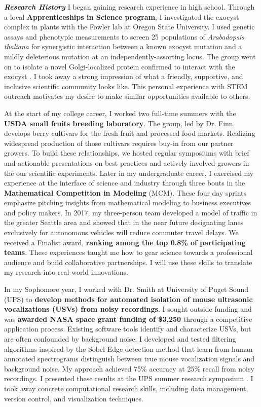 \noindent
\textit{\textbf{Research History}}
I began gaining research experience in high school.
Through a local \textbf{Apprenticeships in Science program}, I investigated the exocyst complex in plants with the Fowler lab at Oregon State University.
I used genetic assays and phenotypic measurements to screen 25 populations of \textit{Arabadopsis thaliana} for synergistic interaction between a known exocyst mutation and a mildly deleterious mutation at an independently-assorting locus.
The group went on to isolate a novel Golgi-localized protein confirmed to interact with the exocyst \cite{fowler}.
I took away a strong impression of what a friendly, supportive, and inclusive scientific community looks like.
This personal experience with STEM outreach motivates my desire to make similar opportunities available to others.

At the start of my college career, I worked two full-time summers with the \textbf{USDA small fruits breeding laboratory}.
The group, led by Dr. Finn, develops berry cultivars for the fresh fruit and processed food markets.
Realizing widespread production of those cultivars requires buy-in from our partner growers.
To build these relationships, we hosted regular symposiums with brief and actionable presentations on best practices and actively involved growers in the our scientific experiments.
Later in my undergraduate career, I exercised my experience at the interface of science and industry through three bouts in the \textbf{Mathematical Competition in Modeling} (MCM).
These four day sprints emphasize pitching insights from mathematical modeling to business executives and policy makers.
In 2017, my three-person team developed a model of traffic in the greater Seattle area and showed that in the near future designating lanes exclusively for autonomous vehicles will reduce commuter travel delays.
We received a Finalist award, \textbf{ranking among the top 0.8\% of participating teams}.
These experiences taught me how to gear science towards a professional audience and build collaborative partnerships.
I will use these skills to translate my research into real-world innovations.

In my Sophomore year, I worked with Dr. Smith at University of Puget Sound (UPS) to \textbf{develop methods for automated isolation of mouse
ultrasonic vocalizations (USVs) from noisy recordings}.
I sought outside funding and was \textbf{awarded NASA space grant funding of \$3,250} through a competitive application process.
Existing software tools identify and characterize USVs, but are often confounded by background noise.
I developed and tested filtering algorithms inspired by the Sobel Edge detection method that learn from human-annotated spectrograms distinguish between true mouse vocalization signals and background noise.
My approach achieved 75\% accuracy at 25\% recall from noisy recordings.
I presented these results at the UPS summer research symposium \cite{smith}.
I took away concrete computational research skills, including data management, version control, and visualization techniques.

